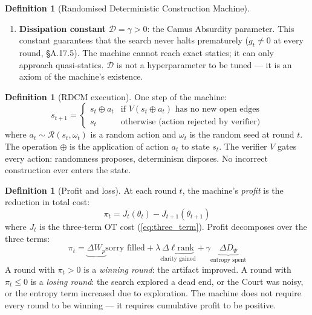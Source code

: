 \documentclass[11pt,a4paper]{article}
\theoremstyle{definition}
\newtheorem{definition}[theorem]{Definition}
\theoremstyle{remark}
\begin{document}
\begin{definition}[Randomised Deterministic Construction Machine]
\begin{enumerate}[nosep]
\item[(v)] \textbf{Dissipation constant} $\mathcal{D} = \gamma > 0$: the Camus Absurdity parameter. This constant guarantees that the search never halts prematurely ($g_t \neq 0$ at every round, \S A.17.5). The machine cannot reach exact statics; it can only approach quasi-statics. $\mathcal{D}$ is not a hyperparameter to be tuned --- it is an axiom of the machine's existence.
\end{enumerate}
\end{definition}

\begin{definition}[RDCM execution]\label{def:rdcm_exec}
One step of the machine:
\[
  s_{t+1} = \begin{cases}
    s_t \oplus a_t & \text{if } V(s_t \oplus a_t) \text{ has no new open edges} \\
    s_t & \text{otherwise (action rejected by verifier)}
  \end{cases}
\]
where $a_t \sim \mathcal{R}(s_t, \omega_t)$ is a random action and $\omega_t$ is the random seed at round $t$. The operation $\oplus$ is the application of action $a_t$ to state $s_t$. The verifier $V$ gates every action: randomness proposes, determinism disposes. No incorrect construction ever enters the state.
\end{definition}

\begin{definition}[Profit and loss]\label{def:profit}
At each round $t$, the machine's \emph{profit} is the reduction in total cost:
\[
  \pi_t = J_t(\theta_t) - J_{t+1}(\theta_{t+1})
\]
where $J_t$ is the three-term OT cost (\ref{eq:three_term}). Profit decomposes over the three terms:
\[
  \pi_t = \underbrace{\Delta W_p}{\text{sorry filled}} + \lambda \underbrace{\Delta \ell{\mathrm{rank}}}_{\text{clarity gained}} + \gamma \underbrace{\Delta D_\Psi}_{\text{entropy spent}}
\]
A round with $\pi_t > 0$ is a \emph{winning round}: the artifact improved. A round with $\pi_t \leq 0$ is a \emph{losing round}: the search explored a dead end, or the Court was noisy, or the entropy term increased due to exploration. The machine does not require every round to be winning --- it requires cumulative profit to be positive.
\end{definition}
\end{document}
